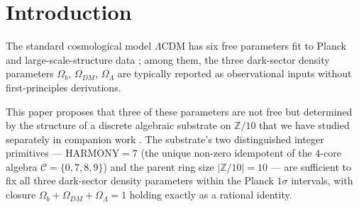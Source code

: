\documentclass[11pt,reqno]{amsart}
\theoremstyle{plain}
\theoremstyle{definition}
\theoremstyle{remark}
\newcommand{\Z}{\mathbb{Z}}
\newcommand{\Aut}{\mathrm{Aut}}
\begin{document}
\begin{abstract}
We pose one forward conjecture: dimensionless fundamental
physical observables admit exact rational representations whose
numerators are constructed from a small set of substrate
primitives (operator labels $\{0, \dots, 9\}$ of $\Z/10$,
$\sigma$-cycle length $|\sigma| = 6$, $4$-core algebraic data
$|V|, |\Aut(V)|$, and the TSML/BHML harmonic counts) and whose
denominators are powers of $|\Z/10|$. The dark-sector trinity,
the consistent spectral-tilt match $n_s$, and the documented
$1/\alpha = 137 + \mathrm{CHAOS}^{2}/|\Z/10|^{3} = 137.036$
identification of \cite{SandersClaudeChat2026BridgeSprint} all
sit inside this admissible family. The conjecture's specific
operator-to-observable map is not yet derived; we invite
empirical testing against further fundamental constants
($m_e/m_p$, $\eta_b$, BBN $D/H$, $H_0$ tension residual) as the
right next step.
\end{abstract}

\maketitle

\tableofcontents

\section{Introduction}\label{sec:intro}

The standard cosmological model $\Lambda$CDM has six free
parameters fit to Planck and large-scale-structure data
\cite{Planck2018}; among them, the three dark-sector density
parameters $\Omega_b$, $\Omega_{DM}$, $\Omega_\Lambda$ are
typically reported as observational inputs without first-principles
derivations.

This paper proposes that three of these parameters are not free
but determined by the structure of a discrete algebraic substrate
on $\Z/10$ that we have studied separately in companion work
\cite{SandersGish2026FourCore, SandersGish2026JCAP}. The
substrate's two distinguished integer primitives ---
$\mathrm{HARMONY} = 7$ (the unique non-zero idempotent of the
$4$-core algebra $\mathcal{C} = \{0, 7, 8, 9\}$) and the parent
ring size $|\Z/10| = 10$ --- are sufficient to fix all three
dark-sector density parameters within the Planck $1\sigma$
intervals, with closure $\Omega_b + \Omega_{DM} + \Omega_\Lambda = 1$
holding exactly as a rational identity.
\end{document}
